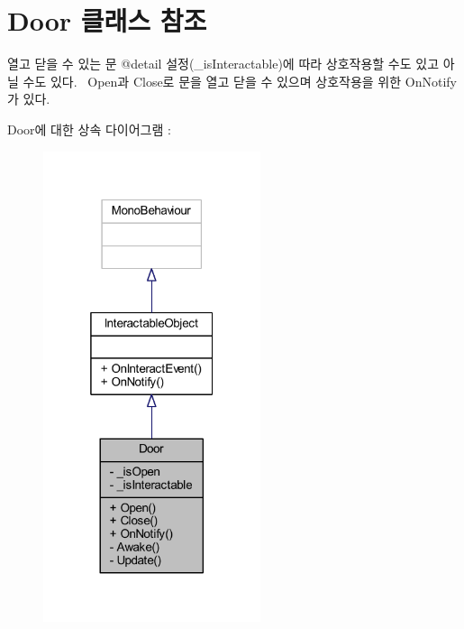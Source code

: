 \hypertarget{class_door}{}\section{Door 클래스 참조}
\label{class_door}


열고 닫을 수 있는 문 @detail 설정(\+\_\+is\+Interactable)에 따라 상호작용할 수도 있고 아닐 수도 있다.~\newline
Open과 Close로 문을 열고 닫을 수 있으며 상호작용을 위한 On\+Notify가 있다.  




Door에 대한 상속 다이어그램 \+: 
\nopagebreak
\begin{figure}[H]
\begin{center}
\leavevmode
\includegraphics[width=181pt]{d0/d5d/class_door__inherit__graph}
\end{center}
\end{figure}



